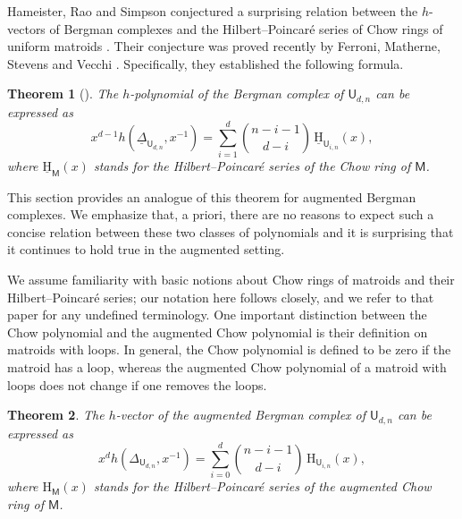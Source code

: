 \documentclass[11pt]{amsart}
\theoremstyle{theorems}
\newtheorem{theorem}{Theorem}[section]
\theoremstyle{definition}
\newcommand{\M}{{\mathsf{M}}}
\newcommand{\U}{{\mathsf{U}}}
\newcommand{\uH}{\underline{\mathrm{H}}}
\newcommand{\uDelta}{\underline{\Delta}}
\begin{document}
Hameister, Rao and Simpson conjectured a surprising relation between 
the $h$-vectors of Bergman complexes and the Hilbert--Poincar\'e 
series of Chow rings of uniform matroids \cite[Conjecture~6.2]{HRS21}. 
Their conjecture was proved recently by Ferroni, Matherne, Stevens 
and Vecchi \cite[Corollary~3.17]{FMSV24}. Specifically, they 
established the following formula. 

\begin{theorem}[\cite{FMSV24}]\label{thm:hrs-identity}
The $h$-polynomial of the Bergman complex of $\U_{d,n}$ can be 
expressed as
%
\[ x^{d-1} h(\uDelta_{\U_{d,n}},x^{-1}) = \sum_{i=1}^d 
   \binom{n-i-1}{d-i} \, \uH_{\U_{i,n}}(x), \]
%
where $\uH_{\M}(x)$ stands for the Hilbert--Poincar\'e series of the 
Chow ring of $\M$.
\end{theorem}

This section provides an analogue of this theorem for augmented Bergman 
complexes. We emphasize that, a priori, there are no reasons to expect 
such a concise relation between these two classes of polynomials and it 
is surprising that it continues to hold true in the augmented setting.

We assume familiarity with basic notions about Chow rings of 
matroids and their Hilbert--Poincar\'e series; our notation here follows 
\cite{FMSV24} closely, and we refer to that paper for any undefined 
terminology. One important distinction between the Chow polynomial and 
the augmented Chow polynomial is their definition on matroids with loops. 
In general, the Chow polynomial is defined to be zero if the matroid has 
a loop, whereas the augmented Chow polynomial of a matroid with loops 
does not change if one removes the loops.

\begin{theorem}
The $h$-vector of the augmented Bergman complex of $\U_{d,n}$ can be 
expressed as
%
\[ x^{d} h(\Delta_{\U_{d,n}},x^{-1}) = \sum_{i=0}^d \binom{n-i-1}{d-i} \,
   \mathrm{H}_{\U_{i,n}}(x), \]
%
where $\mathrm{H}_{\M}(x)$ stands for the Hilbert--Poincar\'e series of the augmented 
Chow ring of $\M$.
\end{theorem}
\end{document}

